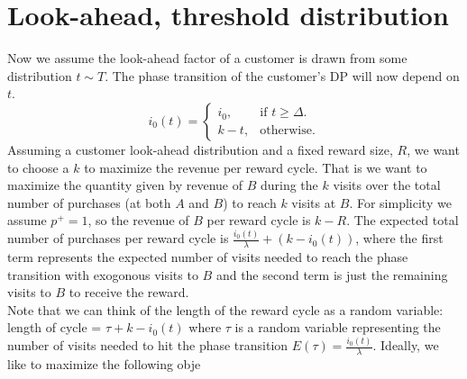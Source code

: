 \documentclass[12pt, a4paper]{article}
\begin{document}
\section{Look-ahead, threshold distribution}
Now we assume the look-ahead factor of a customer is drawn from some distribution $t \sim T$. The phase transition of the customer's DP will now depend on $t$.
\begin{equation*}
  i_0(t)=\begin{cases}
    i_0, & \text{if $t \geq \Delta$}.\\
    k-t, & \text{otherwise}.
  \end{cases}
\end{equation*}
Assuming a customer look-ahead distribution and a fixed reward size, $R$, we want to choose a $k$ to maximize the revenue per reward cycle. That is we want to maximize the quantity given by revenue of $B$ during the $k$ visits over the total number of purchases (at both $A$ and $B$) to reach $k$ visits at $B$. For simplicity we assume $p^+ = 1$, so the revenue of $B$ per reward cycle is $k-R$. The expected total number of purchases per reward cycle is $\frac{i_0(t)}{\lambda}+(k-i_0(t))$, where the first term represents the expected number of visits needed to reach the phase transition with exogonous visits to $B$ and the second term is just the remaining visits to $B$ to receive the reward. \\

Note that we can think of the length of the reward cycle as a random variable: length of cycle = $\tau+k-i_0(t)$ where $\tau$ is a random variable representing the number of visits needed to hit the phase transition $E(\tau) = \frac{i_0(t)}{\lambda}$. Ideally, we like to maximize the following obje
\end{document}
